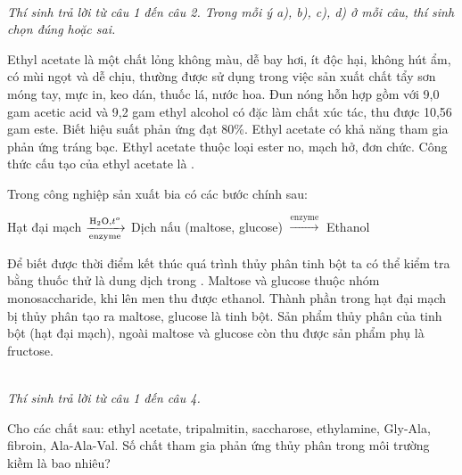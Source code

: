 \documentclass[11pt,a4paper]{article}
\begin{document}
\vspace{6pt}
 \\
\textit{Thí sinh trả lời từ câu 1 đến câu 2. Trong mỗi ý a), b), c), d) ở mỗi câu, thí sinh chọn đúng hoặc sai.}
\vspace{4pt}

\begin{ex}
Ethyl acetate là một chất lỏng không màu, dễ bay hơi, ít độc hại, không hút ẩm, có mùi ngọt và dễ chịu, thường được sử dụng trong việc sản xuất chất tẩy sơn móng tay, mực in, keo dán, thuốc lá, nước hoa.
\choiceTF
\True Đun nóng hỗn hợp gồm với 9,0 gam acetic acid và 9,2 gam ethyl alcohol có  đặc làm chất xúc tác, thu được 10,56 gam este. Biết hiệu suất phản ứng đạt 80\%.
Ethyl acetate có khả năng tham gia phản ứng tráng bạc.
\True Ethyl acetate thuộc loại ester no, mạch hở, đơn chức.
Công thức cấu tạo của ethyl acetate là .
\loigiai{}
\end{ex}

\begin{ex}
Trong công nghiệp sản xuất bia có các bước chính sau:\\
\centerline{Hạt đại mạch $\xrightarrow[\text{enzyme}]{\ce{H2O}, t^o}$ Dịch nấu (maltose, glucose) $\xrightarrow{\text{enzyme}}$ Ethanol}
\choiceTF
\True Để biết được thời điểm kết thúc quá trình thủy phân tinh bột ta có thể kiểm tra bằng thuốc thử là dung dịch  trong .
Maltose và glucose thuộc nhóm monosaccharide, khi lên men thu được ethanol.
\True Thành phần trong hạt đại mạch bị thủy phân tạo ra maltose, glucose là tinh bột.
Sản phẩm thủy phân của tinh bột (hạt đại mạch), ngoài maltose và glucose còn thu được sản phẩm phụ là fructose.
\loigiai{}
\end{ex}

\vspace{6pt}
 \\
\textit{Thí sinh trả lời từ câu 1 đến câu 4.}
\vspace{4pt}

\begin{ex}
Cho các chất sau: ethyl acetate, tripalmitin, saccharose, ethylamine, Gly-Ala, fibroin, Ala-Ala-Val. Số chất tham gia phản ứng thủy phân trong môi trường kiềm là bao nhiêu?
\end{ex}
\end{document}
